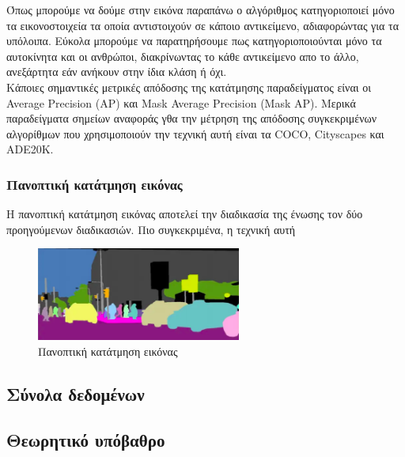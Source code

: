 \documentclass[12pt]{article}
\begin{document}
\newpage
Όπως μπορούμε να δούμε στην εικόνα παραπάνω ο αλγόριθμος κατηγοριοποιεί μόνο τα εικονοστοιχεία τα οποία αντιστοιχούν σε κάποιο αντικείμενο, αδιαφορώντας για τα υπόλοιπα. Εύκολα μπορούμε να παρατηρήσουμε πως κατηγοριοποιούνται μόνο τα αυτοκίνητα και οι ανθρώποι, διακρίνωντας το κάθε αντικείμενο απο το άλλο, ανεξάρτητα εάν ανήκουν στην ίδια κλάση ή όχι. \\

Κάποιες σημαντικές μετρικές απόδοσης της κατάτμησης παραδείγματος είναι οι Average Precision (AP) και Mask Average Precision (Mask AP). Μερικά παραδείγματα σημείων αναφοράς γθα την μέτρηση της απόδοσης συγκεκριμένων αλγορίθμων που χρησιμοποιούν την τεχνική αυτή είναι τα COCO, Cityscapes και ADE20K.

\subsubsection{Πανοπτική κατάτμηση εικόνας}

Η πανοπτική κατάτμηση εικόνας αποτελεί την διαδικασία της ένωσης τον δύο προηγούμενων διαδικασιών. Πιο συγκεκριμένα, η τεχνική αυτή 

\begin{figure}[h!]
  \centering
  \includegraphics[width=0.6\textwidth]{images/figure3.png} %
  \caption{Πανοπτική κατάτμηση εικόνας}
  \label{figure 3}
\end{figure}

\subsection{Σύνολα δεδομένων}

\subsection{Θεωρητικό υπόβαθρο}
\end{document}

